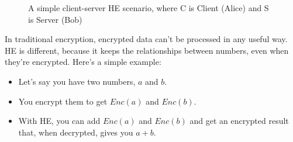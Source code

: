 \documentclass[
  letterpaper,
  DIV=11,
  numbers=noendperiod,
  oneside]{scrartcl}
\begin{document}
\begin{figure}


\caption{\label{fig-simple-he-diagram}A simple client-server HE
scenario, where C is Client (Alice) and S is Server (Bob)}

\end{figure}%

In traditional encryption, encrypted data can't be processed in any
useful way. HE is different, because it keeps the relationships between
numbers, even when they're encrypted. Here's a simple example:

\begin{itemize}
\item
  Let's say you have two numbers, \(a\) and \(b\).
\item
  You encrypt them to get \(Enc(a)\) and \(Enc(b)\).
\item
  With HE, you can add \(Enc(a)\) and \(Enc(b)\) and get an encrypted
  result that, when decrypted, gives you \(a + b\).
\end{itemize}
\end{document}
